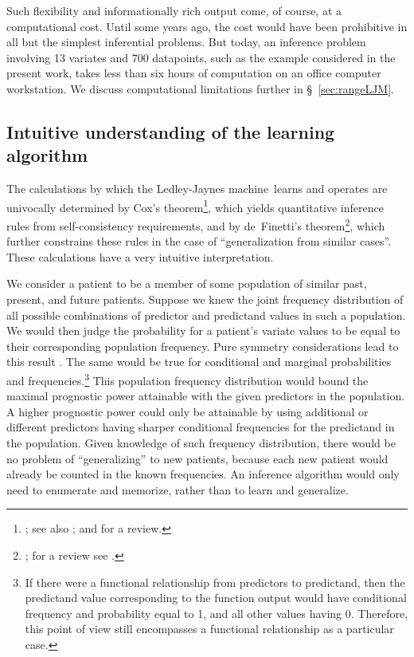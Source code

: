 \documentclass[utf8]{FrontiersinHarvard} %
\newcommand*{\sect}{\S}%
\newcommand*{\sects}{\S\S}%
\renewcommand*{\|}[1][]{\nonscript\:#1\vert\nonscript\:\mathopen{}}
\newcommand*{\ljm}{Ledley-Jaynes machine}
\begin{document}
Such flexibility and informationally rich output come, of course, at a computational cost. Until some years ago, the cost would have been prohibitive in all but the simplest inferential problems. But today, an inference problem involving 13 variates and 700 datapoints, such as the example considered in the present work, takes less than six hours of computation on an office computer workstation. We discuss computational limitations further in \sect~\ref{sec:rangeLJM}.

\subsection{Intuitive understanding of the learning algorithm}
\label{sec:the_machine_learning}

The calculations by which the \ljm\ learns and operates are univocally determined by Cox's theorem\footnote{\citealp{cox1946,cox1961,polya1954,polya1954b_r1968,tribus1969,fine1973,rosenkrantz1977,paris1994_r2006,snow1998,halpern1999b,arnborgetal2001,snow2001,claytonetal2017}; see also \citealp{hailperin1996}; and \citealp{vanhorn2003} for a review.}, which yields quantitative inference rules from self-consistency requirements, and by de~Finetti's theorem\footnote{\citealp[\sects~4.2--4.3]{definetti1930,definetti1937,bernardoetal1994_r2000}; for a review see \citealp{dawid2013}.}, which further constrains these rules in the case of \enquote{generalization from similar cases}. These calculations have a very intuitive interpretation.

We consider a patient to be a member of some population of similar past, present, and future patients. Suppose we knew the joint frequency distribution of all possible combinations of predictor and predictand values in such a population. We would then judge the probability for a patient's variate values to be equal to their corresponding population frequency. Pure symmetry considerations lead to this result \citetext{\citealp[Appendix on eduction]{johnson1924}; \citealp[\sects~4.2--4.3]{johnson1932c,definetti1930,dawid2013,bernardoetal1994_r2000}}. The same would be true for conditional and marginal probabilities and frequencies.\footnote{If there were a functional relationship from predictors to predictand, then the predictand value corresponding to the function output would have conditional frequency and probability equal to 1, and all other values having 0. Therefore, this point of view still encompasses a functional relationship as a particular case.} This population frequency distribution would bound the maximal prognostic power attainable with the given predictors in the population. A higher prognostic power could only be attainable by using additional or different predictors having sharper conditional frequencies for the predictand in the population. Given knowledge of such frequency distribution, there would be no problem of \enquote{generalizing} to new patients, because each new patient would already be counted in the known frequencies. An inference algorithm would only need to enumerate and memorize, rather than to learn and generalize.
\end{document}
